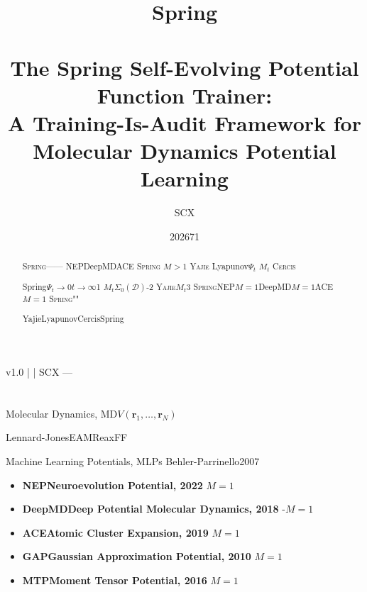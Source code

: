 \documentclass[12pt,a4paper]{article}
\title{\textbf{Spring\\[4pt]
}\\[8pt]
\large The Spring Self-Evolving Potential Function Trainer:\\
A Training-Is-Audit Framework for\\
Molecular Dynamics Potential Learning}
\author{SCX}
\date{202671}
\theoremstyle{remark}
\newcommand{\D}{\mathcal{D}}
\newcommand{\Spring}{\textsc{Spring}}
\newcommand{\Yajie}{\textsc{Yajie}}
\newcommand{\Cercis}{\textsc{Cercis}}
\newcommand{\Lyap}{\ensuremath{\Psi}}
\begin{document}
\maketitle

\begin{center}
\footnotesize
\textbf{} v1.0 \quad | \quad
\textbf{}  \quad | \quad
\textbf{} SCX — 
\end{center}

\begin{abstract}
\Spring{}——
NEPDeepMDACE
\Spring{}
$M>1$
\Yajie{}
Lyapunov$\Lyap_t$
$M_t$
\Cercis{}

Spring$\Lyap_t \to 0$$t \to \infty$1
$M_t$$\Sigma_0(\D)$-2
\Yajie{}$M_t$3
\Spring{}NEP$M=1$DeepMD$M=1$ACE$M=1$
\Spring{}""

\textbf{} YajieLyapunovCercisSpring
\end{abstract}

\tableofcontents
\newpage

\section{}

\subsection{}

Molecular Dynamics, MD$V(\mathbf{r}_1, \ldots, \mathbf{r}_N)$

Lennard-JonesEAMReaxFF
\textbf{}

Machine Learning Potentials, MLPs
Behler-Parrinello2007
\begin{itemize}[nosep]
    \item \textbf{NEPNeuroevolution Potential, 2022} $M=1$
    \item \textbf{DeepMDDeep Potential Molecular Dynamics, 2018} -$M=1$
    \item \textbf{ACEAtomic Cluster Expansion, 2019} $M=1$
    \item \textbf{GAPGaussian Approximation Potential, 2010} $M=1$
    \item \textbf{MTPMoment Tensor Potential, 2016} $M=1$
\end{itemize}
\end{document}
